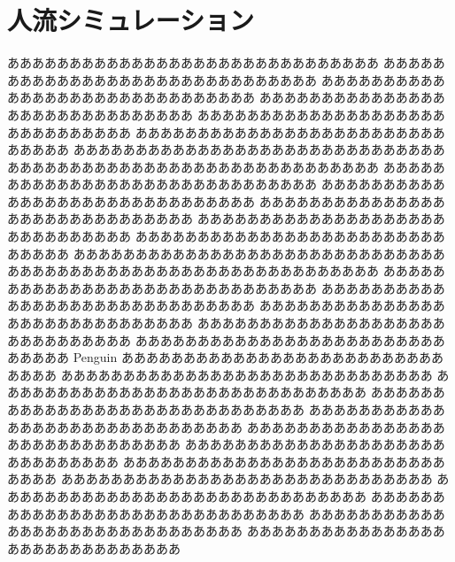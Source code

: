 \chapter{人流シミュレーション}
\label{sec:background}

ああああああああああああああああああああああああああああああ
ああああああああああああああああああああああああああああああ
ああああああああああああああああああああああああああああああ
ああああああああああああああああああああああああああああああ
ああああああああああああああああああああああああああああああ
ああああああああああああああああああああああああああああああ
ああああああああああああああああああああああああああああああ
ああああああああああああああああああああああああああああああ
ああああああああああああああああああああああああああああああ
ああああああああああああああああああああああああああああああ
%
ああああああああああああああああああああああああああああああ
ああああああああああああああああああああああああああああああ
ああああああああああああああああああああああああああああああ
ああああああああああああああああああああああああああああああ
ああああああああああああああああああああああああああああああ
ああああああああああああああああああああああああああああああ
ああああああああああああああああああああああああああああああ
ああああああああああああああああああああああああああああああ
ああああああああああああああああああああああああああああああ
ああああああああああああああああああああああああああああああ
%
Penguin
ああああああああああああああああああああああああああああああ
ああああああああああああああああああああああああああああああ
ああああああああああああああああああああああああああああああ
ああああああああああああああああああああああああああああああ
ああああああああああああああああああああああああああああああ
ああああああああああああああああああああああああああああああ
ああああああああああああああああああああああああああああああ
ああああああああああああああああああああああああああああああ
ああああああああああああああああああああああああああああああ
ああああああああああああああああああああああああああああああ
%
ああああああああああああああああああああああああああああああ
ああああああああああああああああああああああああああああああ
ああああああああああああああああああああああああああああああ
